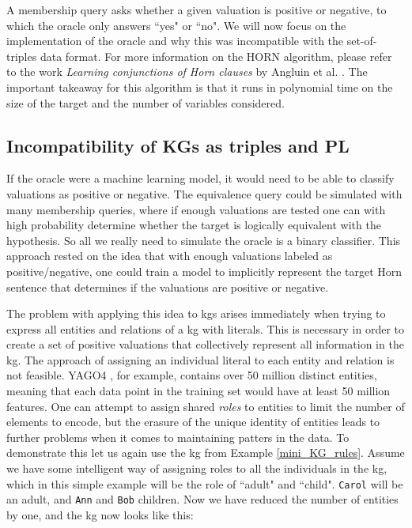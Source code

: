 A membership query asks whether a given valuation is positive or negative, to which the oracle only answers ``yes" or ``no". We will now focus on the implementation of the oracle and why this was incompatible with the set-of-triples data format. For more information on the HORN algorithm, please refer to the work \textit{Learning conjunctions of Horn clauses} by Angluin et al. \cite{DBLP:journals/ml/AngluinFP92}. The important takeaway for this algorithm is that it runs in polynomial time on the size of the target and the number of variables considered.


\subsection{Incompatibility of KGs as triples and PL}
If the oracle were a machine learning model, it would need to be able to classify valuations as positive or negative. The equivalence query could be simulated with many membership queries, where if enough valuations are tested one can with high probability determine whether the target is logically equivalent with the hypothesis. So all we really need to simulate the oracle is a binary classifier. This approach rested on the idea that with enough valuations labeled as positive/negative, one could train a model to implicitly represent the target Horn sentence that determines if the valuations are positive or negative. 

The problem with applying this idea to \glspl{kg} arises immediately when trying to express all entities and relations of a \gls{kg} with literals. This is necessary in order to create a set of positive valuations that collectively represent all information in the \gls{kg}. The approach of assigning an individual literal to each entity and relation is not feasible. YAGO4 \cite{yago4}, for example, contains over 50 million distinct entities, meaning that each data point in the training set would have at least 50 million features. One can attempt to assign shared \textit{roles} to entities to limit the number of elements to encode, but the erasure of the unique identity of entities leads to further problems when it comes to maintaining patters in the data. To demonstrate this let us again use the \gls{kg} from Example \ref{mini_KG_rules}. Assume we have some intelligent way of assigning roles to all the individuals in the \gls{kg}, which in this simple example will be the role of ``adult" and ``child". \texttt{Carol} will be an adult, and \texttt{Ann} and \texttt{Bob} children. Now we have reduced the number of entities by one, and the \gls{kg} now looks like this:

